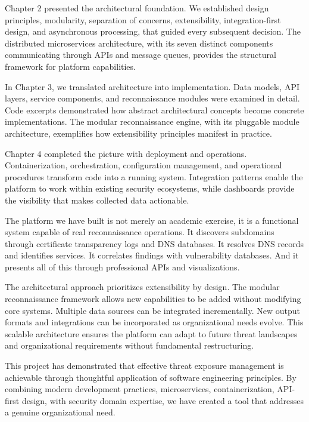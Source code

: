 \documentclass[a4paper,12pt]{report}
\begin{document}
Chapter 2 presented the architectural foundation. We established design principles, modularity, separation of concerns, extensibility, integration-first design, and asynchronous processing, that guided every subsequent decision. The distributed microservices architecture, with its seven distinct components communicating through APIs and message queues, provides the structural framework for platform capabilities.\hfill \break

In Chapter 3, we translated architecture into implementation. Data models, API layers, service components, and reconnaissance modules were examined in detail. Code excerpts demonstrated how abstract architectural concepts become concrete implementations. The modular reconnaissance engine, with its pluggable module architecture, exemplifies how extensibility principles manifest in practice.\hfill \break

Chapter 4 completed the picture with deployment and operations. Containerization, orchestration, configuration management, and operational procedures transform code into a running system. Integration patterns enable the platform to work within existing security ecosystems, while dashboards provide the visibility that makes collected data actionable.\hfill \break

The platform we have built is not merely an academic exercise, it is a functional system capable of real reconnaissance operations. It discovers subdomains through certificate transparency logs and DNS databases. It resolves DNS records and identifies services. It correlates findings with vulnerability databases. And it presents all of this through professional APIs and visualizations.\hfill \break

The architectural approach prioritizes extensibility by design. The modular reconnaissance framework allows new capabilities to be added without modifying core systems. Multiple data sources can be integrated incrementally. New output formats and integrations can be incorporated as organizational needs evolve. This scalable architecture ensures the platform can adapt to future threat landscapes and organizational requirements without fundamental restructuring.\hfill \break

This project has demonstrated that effective threat exposure management is achievable through thoughtful application of software engineering principles. By combining modern development practices, microservices, containerization, API-first design, with security domain expertise, we have created a tool that addresses a genuine organizational need.\hfill \break
\end{document}
